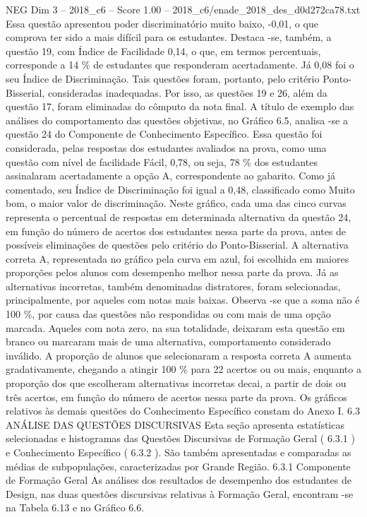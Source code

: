 \begin{textsample}{NEG Dim 3 – 2018\_c6 – Score 1.00 – 2018\_c6/enade\_2018\_des\_d0d272ca78.txt}
Essa questão apresentou poder discriminatório muito baixo, -0,01, o que comprova ter sido a mais difícil para os estudantes.
Destaca -se, também, a questão 19, com Índice de Facilidade 0,14, o que, em termos percentuais, corresponde a 14 \% de estudantes que responderam acertadamente.
Já 0,08 foi o seu Índice de Discriminação.
Tais questões foram, portanto, pelo critério Ponto-Bisserial, consideradas inadequadas.
Por isso, as questões 19 e 26, além da questão 17, foram eliminadas do cômputo da nota final.
A título de exemplo das análises do comportamento das questões objetivas, no Gráfico 6.5, analisa -se a questão 24 do Componente de Conhecimento Específico.
Essa questão foi considerada, pelas respostas dos estudantes avaliados na prova, como uma questão com nível de facilidade Fácil, 0,78, ou seja, 78 \% dos estudantes assinalaram acertadamente a opção A, correspondente ao gabarito.
Como já comentado, seu Índice de Discriminação foi igual a 0,48, classificado como Muito bom, o maior valor de discriminação.
Neste gráfico, cada uma das cinco curvas representa o percentual de respostas em determinada alternativa da questão 24, em função do número de acertos dos estudantes nessa parte da prova, antes de possíveis eliminações de questões pelo critério do Ponto-Bisserial.
A alternativa correta A, representada no gráfico pela curva em azul, foi escolhida em maiores proporções pelos alunos com desempenho melhor nessa parte da prova.
Já as alternativas incorretas, também denominadas distratores, foram selecionadas, principalmente, por aqueles com notas mais baixas.
Observa -se que a soma não é 100 \%, por causa das questões não respondidas ou com mais de uma opção marcada.
Aqueles com nota zero, na sua totalidade, deixaram esta questão em branco ou marcaram mais de uma alternativa, comportamento considerado inválido.
A proporção de alunos que selecionaram a resposta correta A aumenta gradativamente, chegando a atingir 100 \% para 22 acertos ou ou mais, enquanto a proporção dos que escolheram alternativas incorretas decai, a partir de dois ou três acertos, em função do número de acertos nessa parte da prova.
Os gráficos relativos às demais questões do Conhecimento Específico constam do Anexo I. 6.3 ANÁLISE DAS QUESTÕES DISCURSIVAS Esta seção apresenta estatísticas selecionadas e histogramas das Questões Discursivas de Formação Geral ( 6.3.1 ) e Conhecimento Específico ( 6.3.2 ).
São também apresentadas e comparadas as médias de subpopulações, caracterizadas por Grande Região. 6.3.1 Componente de Formação Geral As análises dos resultados de desempenho dos estudantes de Design, nas duas questões discursivas relativas à Formação Geral, encontram -se na Tabela 6.13 e no Gráfico 6.6.

\end{textsample}
